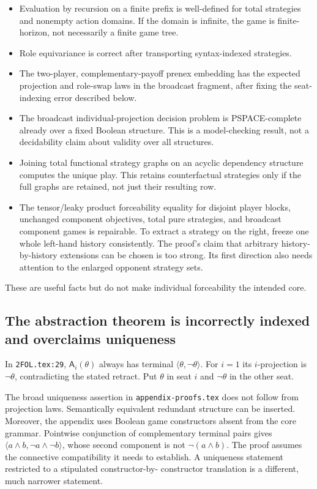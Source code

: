 \documentclass[11pt]{article}
\begin{document}
\begin{itemize}
\item Evaluation by recursion on a finite prefix is well-defined for total
      strategies and nonempty action domains. If the domain is infinite, the
      game is finite-horizon, not necessarily a finite game tree.
\item Role equivariance is correct after transporting syntax-indexed strategies.
\item The two-player, complementary-payoff prenex embedding has the expected
      projection and role-swap laws in the broadcast fragment, after fixing the
      seat-indexing error described below.
\item The broadcast individual-projection decision problem is PSPACE-complete
      already over a fixed Boolean structure. This is a model-checking result,
      not a decidability claim about validity over all structures.
\item Joining total functional strategy graphs on an acyclic dependency structure
      computes the unique play. This retains counterfactual strategies only if
      the full graphs are retained, not just their resulting row.
\item The tensor/leaky product forceability equality for disjoint player blocks,
      unchanged component objectives, total pure strategies, and broadcast
      component games is repairable. To extract a strategy on the right, freeze
      one whole left-hand history consistently. The proof's claim that arbitrary
      history-by-history extensions can be chosen is too strong. Its first
      direction also needs attention to the enlarged opponent strategy sets.
\end{itemize}

These are useful facts but do not make individual forceability the intended core.

\subsection{The abstraction theorem is incorrectly indexed and overclaims uniqueness}

In \texttt{2FOL.tex:29}, $\mathsf A_i(\theta)$ always has terminal
$\langle\theta,\neg\theta\rangle$. For $i=1$ its $i$-projection is
$\neg\theta$, contradicting the stated retract. Put $\theta$ in seat $i$ and
$\neg\theta$ in the other seat.

The broad uniqueness assertion in \texttt{appendix-proofs.tex} does not follow
from projection laws. Semantically equivalent redundant structure can be
inserted. Moreover, the appendix uses Boolean game constructors absent from the
core grammar. Pointwise conjunction of complementary terminal pairs gives
$\langle a\land b,\neg a\land\neg b\rangle$, whose second component is not
$\neg(a\land b)$. The proof assumes the connective compatibility it needs to
establish. A uniqueness statement restricted to a stipulated constructor-by-
constructor translation is a different, much narrower statement.
\end{document}
